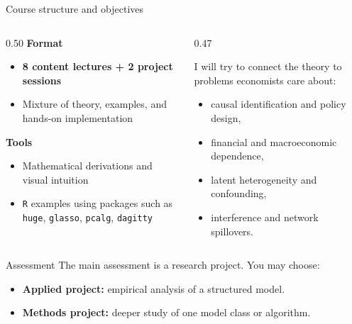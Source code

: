 \documentclass[dvipsnames,aspectratio=169,handout]{beamer}
\begin{document}
\begin{frame}{Course structure and objectives}
\small
\begin{columns}[T]
\begin{column}{0.50\textwidth}
\textbf{Format}
\begin{itemize}
    \item \textbf{8 content lectures + 2 project sessions}
    \item Mixture of theory, examples, and hands-on implementation
\end{itemize}

\textbf{Tools}
\begin{itemize}
    \item Mathematical derivations and visual intuition
    \item \texttt{R} examples using packages such as
    \texttt{huge}, \texttt{glasso}, \texttt{pcalg}, \texttt{dagitty}
\end{itemize}
\end{column}

\begin{column}{0.47\textwidth}
\begin{block}{\small {}}
I will try to connect the theory to problems economists care about:
\begin{itemize}
    \item \small causal identification and policy design,
    \item \small financial and macroeconomic dependence,
    \item \small latent heterogeneity and confounding,
    \item \small interference and network spillovers.
\end{itemize}
\end{block}
\end{column}
\end{columns}

\vspace{1mm}

\begin{alertblock}{Assessment}
The main assessment is a research project. You may choose:
\begin{itemize}
    \item \textbf{Applied project:} empirical analysis of a structured model.
    \item \textbf{Methods project:} deeper study of one model class or algorithm.
\end{itemize}
\end{alertblock}
\end{frame}
\end{document}
